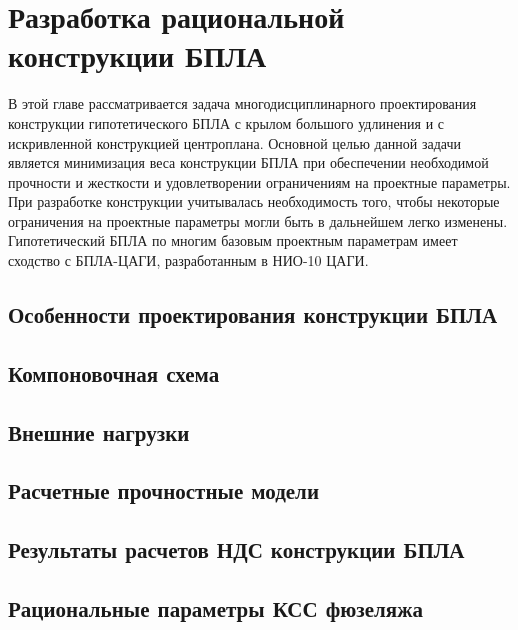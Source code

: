 \chapter{Разработка рациональной конструкции БПЛА}

В этой главе рассматривается задача многодисциплинарного проектирования конструкции гипотетического БПЛА с крылом большого удлинения и с искривленной конструкцией центроплана.  Основной целью данной задачи является минимизация веса конструкции БПЛА при обеспечении необходимой прочности и жесткости и удовлетворении ограничениям на проектные параметры. При разработке конструкции учитывалась необходимость того, чтобы некоторые ограничения на проектные параметры могли быть в дальнейшем легко изменены. Гипотетический БПЛА по многим базовым проектным параметрам имеет сходство с БПЛА-ЦАГИ, разработанным в НИО-10 ЦАГИ.


\section{Особенности проектирования конструкции БПЛА}



\section{Компоновочная схема}
	

\section{Внешние нагрузки}
\label{sec:externalLoads}



\section{Расчетные прочностные модели}




\section{Результаты расчетов НДС конструкции БПЛА} 


\section{Рациональные параметры КСС фюзеляжа}

